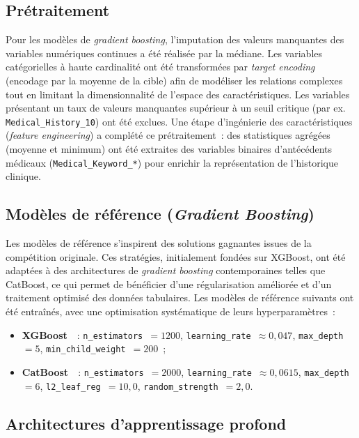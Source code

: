 \documentclass[conference]{IEEEtran}
\begin{document}
\subsection{Prétraitement}

Pour les modèles de \textit{gradient boosting}, l'imputation des valeurs manquantes des variables numériques continues a été réalisée par la médiane. Les variables catégorielles à haute cardinalité ont été transformées par \textit{target encoding} (encodage par la moyenne de la cible) afin de modéliser les relations complexes tout en limitant la dimensionnalité de l'espace des caractéristiques. Les variables présentant un taux de valeurs manquantes supérieur à un seuil critique (par ex. \texttt{Medical\_History\_10}) ont été exclues. Une étape d'ingénierie des caractéristiques (\textit{feature engineering}) a complété ce prétraitement~: des statistiques agrégées (moyenne et minimum) ont été extraites des variables binaires d'antécédents médicaux (\texttt{Medical\_Keyword\_*}) pour enrichir la représentation de l'historique clinique.

\subsection{Modèles de référence (\textit{Gradient Boosting})}

Les modèles de référence s'inspirent des solutions gagnantes issues de la compétition originale. Ces stratégies, initialement fondées sur XGBoost, ont été adaptées à des architectures de \textit{gradient boosting} contemporaines telles que CatBoost, ce qui permet de bénéficier d'une régularisation améliorée et d'un traitement optimisé des données tabulaires. Les modèles de référence suivants ont été entraînés, avec une optimisation systématique de leurs hyperparamètres~:
\begin{itemize}
  \item \textbf{XGBoost}~\cite{chen2016xgboost}~: \texttt{n\_estimators}~$=1200$, \texttt{learning\_rate}~$\approx 0{,}047$, \texttt{max\_depth}~$=5$, \texttt{min\_child\_weight}~$=200$~;
  \item \textbf{CatBoost}~\cite{prokhorenkova2018catboost}~: \texttt{n\_estimators}~$=2000$, \texttt{learning\_rate}~$\approx 0{,}0615$, \texttt{max\_depth}~$=6$, \texttt{l2\_leaf\_reg}~$=10{,}0$, \texttt{random\_strength}~$=2{,}0$.
\end{itemize}

\subsection{Architectures d'apprentissage profond}
\end{document}
